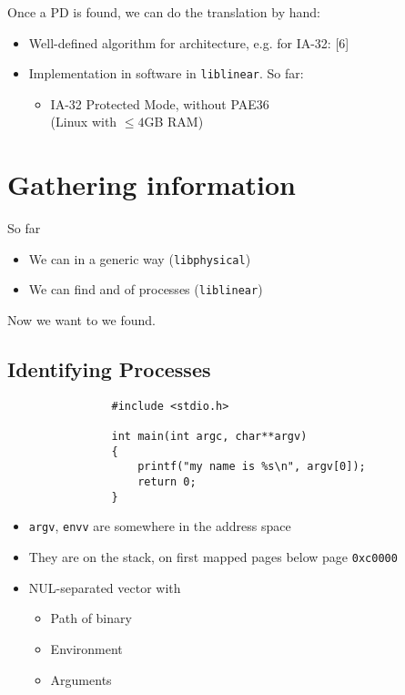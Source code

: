 \documentclass{beamer}
\newenvironment{itemizeframe}[1]
  {\begin{frame}{#1}\startitemizeframe}
  {\stopitemizeframe\end{frame}}
\newcommand\startitemizeframe{\begin{itemize}}
\newcommand\stopitemizeframe{\end{itemize}}
\begin{document}
		\begin{frame}
			Once a PD is found, we can do the translation by hand:
			\begin{itemize}
				\item Well-defined algorithm for architecture, e.g. for IA-32: [6]
				\item Implementation in software in \texttt{liblinear}. So far:
				\begin{itemize}
					\item IA-32 Protected Mode, without PAE36 \\ (Linux with $\leq 4$GB RAM)
				\end{itemize}
			\end{itemize}
		\end{frame}

\section{Gathering information}

	\begin{frame}
		So far
		\begin{itemize}
			\item We can  in a generic way (\texttt{libphysical})
			\item We can find and  of processes (\texttt{liblinear})
		\end{itemize}
		Now we want to  we found.
	\end{frame}

	\subsection{Identifying Processes}
	
		\begin{frame}[fragile]
			\begin{verbatim}
				#include <stdio.h>

				int main(int argc, char**argv)
				{
					printf("my name is %s\n", argv[0]);
					return 0;
				}
			\end{verbatim}
		\end{frame}

		\begin{itemizeframe}{}
			\item \texttt{argv}, \texttt{envv} are somewhere in the address space
			\item<2-> They are on the stack, on first mapped pages below page \texttt{0xc0000}
			\item<2-> NUL-separated vector with
			\begin{itemize}
				\item<2-> Path of binary
				\item<2-> Environment
				\item<2-> Arguments
			\end{itemize}
		\end{itemizeframe}
\end{document}
